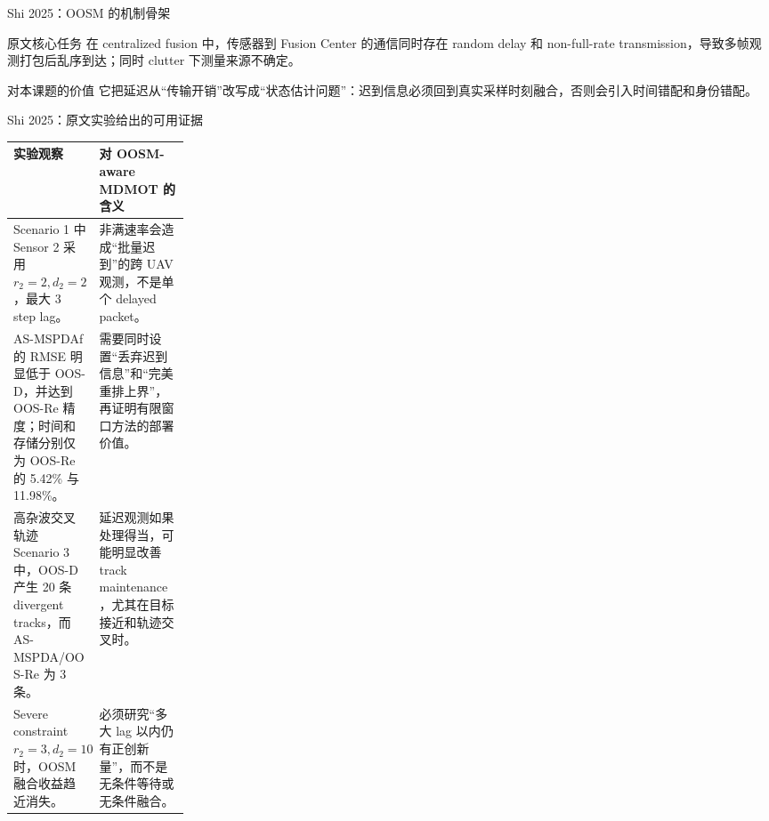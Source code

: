 \documentclass[aspectratio=169,xcolor=dvipsnames]{beamer}
\begin{document}
\begin{frame}{Shi 2025：OOSM 的机制骨架}
\small
\begin{block}{原文核心任务}
在 centralized fusion 中，传感器到 Fusion Center 的通信同时存在 random delay 和 non-full-rate transmission，导致多帧观测打包后乱序到达；同时 clutter 下测量来源不确定。
\end{block}

\begin{center}
\end{center}

\begin{block}{对本课题的价值}
它把延迟从“传输开销”改写成“状态估计问题”：迟到信息必须回到真实采样时刻融合，否则会引入时间错配和身份错配。
\end{block}
\end{frame}

\begin{frame}{Shi 2025：原文实验给出的可用证据}
\scriptsize
\begin{tabularx}{\linewidth}{p{0.23\linewidth} X}
\toprule
实验观察 & 对 OOSM-aware MDMOT 的含义 \\
\midrule
Scenario 1 中 Sensor 2 采用 \(r_2=2,d_2=2\)，最大 3 step lag。 &
非满速率会造成“批量迟到”的跨 UAV 观测，不是单个 delayed packet。 \\
\addlinespace
AS-MSPDAf 的 RMSE 明显低于 OOS-D，并达到 OOS-Re 精度；时间和存储分别仅为 OOS-Re 的 5.42\% 与 11.98\%。 &
需要同时设置“丢弃迟到信息”和“完美重排上界”，再证明有限窗口方法的部署价值。 \\
\addlinespace
高杂波交叉轨迹 Scenario 3 中，OOS-D 产生 20 条 divergent tracks，而 AS-MSPDA/OOS-Re 为 3 条。 &
延迟观测如果处理得当，可能明显改善 track maintenance，尤其在目标接近和轨迹交叉时。 \\
\addlinespace
Severe constraint \(r_2=3,d_2=10\) 时，OOSM 融合收益趋近消失。 &
必须研究“多大 lag 以内仍有正创新量”，而不是无条件等待或无条件融合。 \\
\bottomrule
\end{tabularx}
\end{frame}
\end{document}
